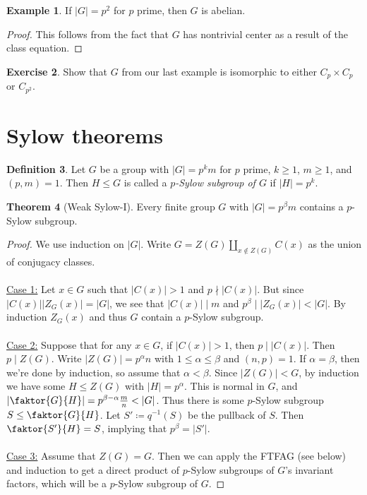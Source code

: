 \documentclass[10pt,letterpaper,cm]{nupset}
\theoremstyle{definition}
\newtheorem{definition}{Definition}[subsection]
\newtheorem{exmp}[definition]{Example}
\theoremstyle{theorem}
\newtheorem{theorem}[definition]{Theorem}
\newtheorem{exercise}[definition]{Exercise}
\theoremstyle{remark}
\newcommand{\1}{\mathbf{1}}
\newcommand{\0}{\vec 0}
\begin{document}
\begin{exmp}
If $|G| =p^2$ for $p$ prime, then $G$ is abelian.
\end{exmp}
\begin{proof}
This follows from the fact that $G$ has nontrivial center as a result of the class equation.
\end{proof}

\begin{exercise}
Show that $G$ from our last example is isomorphic to either $C_p \times C_p$ or $C_{p^2}$.
\end{exercise}

\section{Sylow theorems}

\begin{definition}
Let $G$ be a group with $|G|= p^km$ for $p$ prime, $k\geq 1$, $m\geq 1$, and $(p,m) =1$. Then $H \leq G$ is called a \textit{$p$-Sylow subgroup of $G$} if $|H| = p^k$.
\end{definition}

\begin{theorem}[Weak Sylow-I]
Every finite group $G$ with $|G| = p^{\beta}m$ contains a $p$-Sylow subgroup.
\end{theorem}
\begin{proof}
We use induction on $|G|$. Write $G= Z(G) \coprod_{x\notin Z(G)} C(x)$ as the union of conjugacy classes. \\ \\ \underline{Case 1:} Let $x\in G$ such that $|C(x)|>1$ and $p\nmid |C(x)|$. But since $|C(x)||Z_G(x)| =|G|$, we see that $|C(x)| \mid m$ and $p^{\beta}\mid |Z_G(x)|< |G|$. By induction $Z_G(x)$ and thus $G$ contain a $p$-Sylow subgroup.
\\ \\ \underline{Case 2:}
 Suppose that for any $x\in G$, if $|C(x)| >1$, then $p\mid |C(x)|$. Then $p\mid Z(G)$. Write $|Z(G)| = p^{\alpha}n$ with $1\leq \alpha\leq \beta$ and $(n, p)=1$. If $\alpha = \beta$, then we're done by induction, so assume that $\alpha <
 \beta$. Since $|Z(G)| < G$, by induction we have some $H\leq Z(G)$ with $|H| = p^{\alpha}$. This is normal in $G$, and $|\faktor{G}{H}| = p^{\beta - \alpha}\frac{m}{n} < |G|$. Thus there is some $p$-Sylow subgroup $S\leq \faktor{G}{H}$.  Let $S'\coloneqq q^{-1}(S)$ be the pullback of $S$.  Then $\faktor{S'}{H} =S$, implying that $p^{\beta}= |S'|$. 
\\ \\ \underline{Case 3:} Assume that $Z(G) = G$. Then we can apply the FTFAG (see below) and induction to get a direct product of $p$-Sylow subgroups of $G$'s invariant factors, which will be a $p$-Sylow subgroup of $G$. 
\end{proof}
\end{document}
